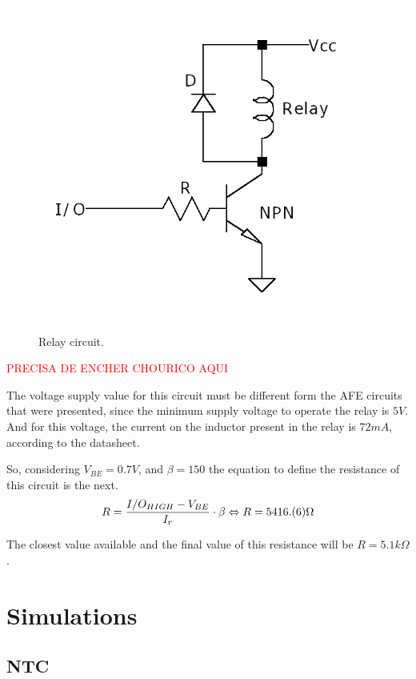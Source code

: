 \documentclass[12pt]{article}
\begin{document}
    \begin{figure}[H] 
        \centering
        \includegraphics*[scale = 0.4]{images/RelayDrive.png}
        \caption{Relay circuit.}
        \label{wrap-fig:1}
    \end{figure}
    \textcolor{red}{PRECISA DE ENCHER CHOURICO AQUI}

    The voltage supply value for this circuit must be different form the AFE circuits that were presented,
    since the minimum supply voltage to operate the relay is $5V$. And for this voltage, the 
    current on the inductor present in the relay is $72mA$, according to the datasheet.
    
    So, considering $V_{BE} = 0.7V$, and $\beta = 150$ the equation to define the resistance of this circuit is the next.
    \begin{equation}
        R = \frac{I/O_{HIGH}-V_{BE}}{I_r}\cdot \beta\\
        \Leftrightarrow R = 5416.(6) \Omega
    \end{equation}

    The closest value available and the final value of this resistance will be $R = 5.1 k\Omega$.
\newpage
\section{Simulations}
\subsection{NTC}
    
\end{document}

